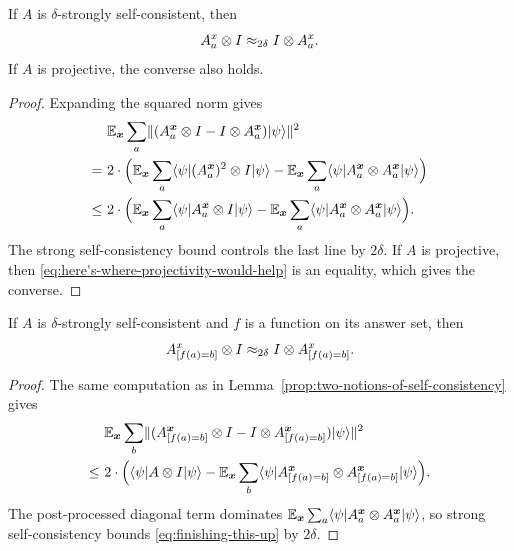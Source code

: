 \begin{lemma}\label{prop:two-notions-of-self-consistency}
	\leanok
	If $A$ is $\delta$-strongly self-consistent, then
	\[
		A_a^x \otimes I \approx_{2\delta} I \otimes A_a^x.
	\]
	If $A$ is projective, the converse also holds.
\end{lemma}
\begin{proof}
	\leanok
	Expanding the squared norm gives
	\begin{align}
		      & \mathbb{E}_{{\boldsymbol{x}}} \sum_a \lVert(A^{{\boldsymbol{x}}}_a \otimes I - I \otimes A^{{\boldsymbol{x}}}_a)\lvert \psi \rangle\rVert^2 \nonumber                                                                  \\
		=~    & 2\cdot \Big( \mathbb{E}_{{\boldsymbol{x}}} \sum_a \langle \psi \rvert (A^{{\boldsymbol{x}}}_a)^2 \otimes I \lvert \psi \rangle -  \mathbb{E}_{{\boldsymbol{x}}} \sum_a \langle \psi \rvert A^{{\boldsymbol{x}}}_a \otimes A^{{\boldsymbol{x}}}_a \lvert \psi \rangle\Big) \nonumber \\
		\leq~ & 2\cdot \Big( \mathbb{E}_{{\boldsymbol{x}}} \sum_a \langle \psi \rvert A^{{\boldsymbol{x}}}_a \otimes I \lvert \psi \rangle -  \mathbb{E}_{{\boldsymbol{x}}} \sum_a \langle \psi \rvert A^{{\boldsymbol{x}}}_a \otimes A^{{\boldsymbol{x}}}_a \lvert \psi \rangle\Big).
		\label{eq:here's-where-projectivity-would-help}
	\end{align}
	The strong self-consistency bound controls the last line by $2\delta$. If $A$ is projective, then \eqref{eq:here's-where-projectivity-would-help} is an equality, which gives the converse.
\end{proof}

\begin{lemma}\label{prop:two-notions-of-self-consistency-after-evaluation}
	\leanok
	If $A$ is $\delta$-strongly self-consistent and $f$ is a function on its answer set, then
	\[
		A_{[f(a)=b]}^x \otimes I \approx_{2\delta} I \otimes A_{[f(a)=b]}^x.
	\]
\end{lemma}
\begin{proof}
	\leanok
	The same computation as in Lemma~\ref{prop:two-notions-of-self-consistency} gives
	\begin{align}
		      & \mathbb{E}_{{\boldsymbol{x}}} \sum_b \lVert(A^{{\boldsymbol{x}}}_{[f(a)=b]} \otimes I - I \otimes A^{{\boldsymbol{x}}}_{[f(a)=b]}) \lvert \psi \rangle\rVert^2 \nonumber                            \\
		\leq~ & 2\cdot \Big( \langle \psi \rvert A \otimes I \lvert \psi \rangle -  \mathbb{E}_{{\boldsymbol{x}}} \sum_b \langle \psi \rvert A^{{\boldsymbol{x}}}_{[f(a)=b]} \otimes A^{{\boldsymbol{x}}}_{[f(a)=b]} \lvert \psi \rangle\Big).
		\label{eq:finishing-this-up}
	\end{align}
	The post-processed diagonal term dominates $\mathbb{E}_{{\boldsymbol{x}}} \sum_a \langle \psi \rvert A^{\boldsymbol{x}}_a \otimes A^{\boldsymbol{x}}_a \lvert \psi \rangle$, so strong self-consistency bounds \eqref{eq:finishing-this-up} by $2\delta$.
\end{proof}


